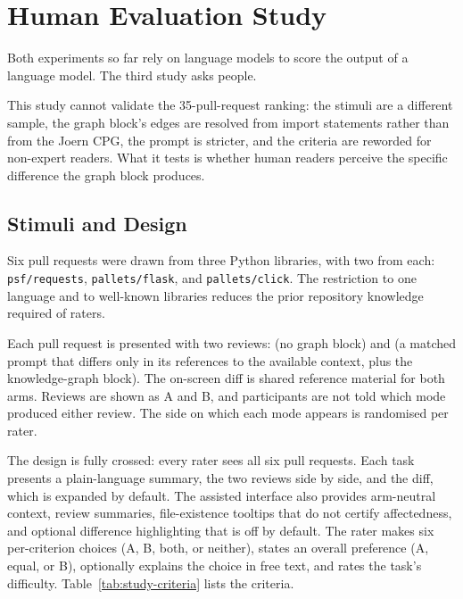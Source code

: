 \section{Human Evaluation Study}
\label{sec:human-study}

Both experiments so far rely on language models to score the output of a
language model. The third study asks people.

This study cannot validate the 35-pull-request ranking: the stimuli are a
different sample, the graph block's edges are resolved from import statements rather than
from the Joern CPG, the prompt is stricter, and the criteria are reworded for non-expert readers. What it
tests is whether human readers perceive the specific difference the graph
block produces.

\subsection{Stimuli and Design}

Six pull requests were drawn from three Python libraries, with two from each:
\texttt{psf/requests}, \texttt{pallets/flask}, and \texttt{pallets/click}.
The restriction to one language and to well-known libraries reduces the prior
repository knowledge required of raters.

Each pull request is presented with two reviews: \baseline{} (no graph
block) and \kg{} (a matched prompt that differs only in its
references to the available context, plus the knowledge-graph block). The on-screen diff is shared reference material for both
arms. Reviews are shown as A and B, and participants are not told which mode
produced either review. The side on which each mode appears is randomised per
rater.

The design is fully crossed: every rater sees all six pull requests. Each
task presents a plain-language summary, the two reviews side by side, and
the diff, which is expanded by default. The assisted interface also provides
arm-neutral context, review summaries, file-existence tooltips that do not
certify affectedness, and optional difference highlighting that is off by
default. The rater makes six per-criterion choices (A, B, both, or neither),
states an overall preference (A, equal, or B), optionally explains the choice
in free text, and rates the task's difficulty.
Table~\ref{tab:study-criteria} lists the criteria.

